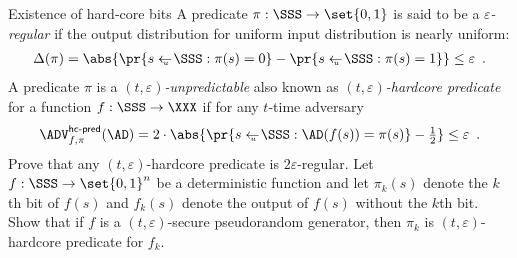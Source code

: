 \documentclass{crypto-exercise}
\author{Sven Laur}
\begin{document}
\begin{exercise}{Existence of hard-core bits}
A predicate $\pi:\SSS\to\set{0,1}$ is said to be a
  \emph{$\varepsilon$-regular} if the output distribution for uniform
  input distribution is nearly uniform:
  \begin{align*}
   \Delta(\pi)=\abs{\pr{s\getsu\SSS:\pi(s)=0}-\pr{s\getsu\SSS:\pi(s)=1}}
   \leq\varepsilon\enspace.     
  \end{align*}
  A predicate $\pi$ is a \emph{$(t,\varepsilon)$-unpredictable} also
  known as \emph{$(t,\varepsilon)$-hardcore predicate} for a function
  $f:\SSS\to\XXX$ if for any $t$-time adversary
  \begin{align*}
    \advHCPredXX{f,\pi}{\AD}%
    =2\cdot\abs{\pr{s\getsu\SSS:\AD(f(s))=\pi(s)}-{\textstyle\frac{1}{2}}}\leq\varepsilon\enspace.
  \end{align*}
  Prove that any $(t,\varepsilon)$-hardcore predicate is $2\varepsilon$-regular. Let $f:\SSS\to\set{0,1}^n$ be a deterministic function and let
    $\pi_k(s)$ denote the $k$th bit of $f(s)$ and $f_k(s)$ denote the
    output of $f(s)$ without the $k$th bit. Show that if $f$ is a
    $(t,\varepsilon)$-secure pseudorandom generator, then $\pi_k$ is
    $(t,\varepsilon)$-hardcore predicate for $f_k$.
\end{exercise}
\end{document}
